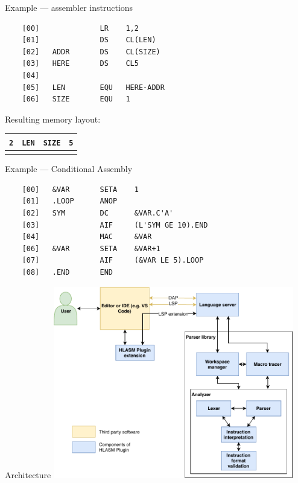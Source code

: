 \documentclass[10pt]{beamer}
\begin{document}
\begin{frame}[fragile]{Example --- assembler instructions}
  
	\begin{verbatim}
	[00]              LR    1,2
	[01]              DS    CL(LEN)
	[02]   ADDR       DS    CL(SIZE)
	[03]   HERE       DS    CL5
	[04]
	[05]   LEN        EQU   HERE-ADDR
	[06]   SIZE       EQU   1
	\end{verbatim}
	
	Resulting memory layout:
	
	\begin{table}[]
		\begin{tabular}{clll}
			
			\multicolumn{1}{|p{0.5cm}|}{\centering\texttt{2}} & \multicolumn{1}{p{2cm}|}{\centering\texttt{LEN}} & \multicolumn{1}{p{3cm}|}{\centering\texttt{SIZE}} & \multicolumn{1}{p{1.5cm}|}{\centering\texttt{5}}  \\ \hline
			 &   & \multicolumn{1}{l}{\hspace{-10pt}\rotatebox{90}{\texttt{ADDR->} }}  & \multicolumn{1}{l}{\hspace{-10pt}\rotatebox{90}{\texttt{HERE->}}}                       
		\end{tabular}
	\end{table}
	
\end{frame}

\begin{frame}[fragile]{Example --- Conditional Assembly}


\begin{verbatim}
	[00]   &VAR       SETA    1
	[01]   .LOOP      ANOP         
	[02]   SYM        DC      &VAR.C'A'
	[03]              AIF     (L'SYM GE 10).END
	[04]              MAC     &VAR
	[06]   &VAR       SETA    &VAR+1
	[07]              AIF     (&VAR LE 5).LOOP
	[08]   .END       END     
\end{verbatim}

\end{frame}

\begin{frame}{Architecture}
\centering
\includegraphics[width=10.5cm]{img/hlasm_architecture}
\end{frame}
\end{document}
